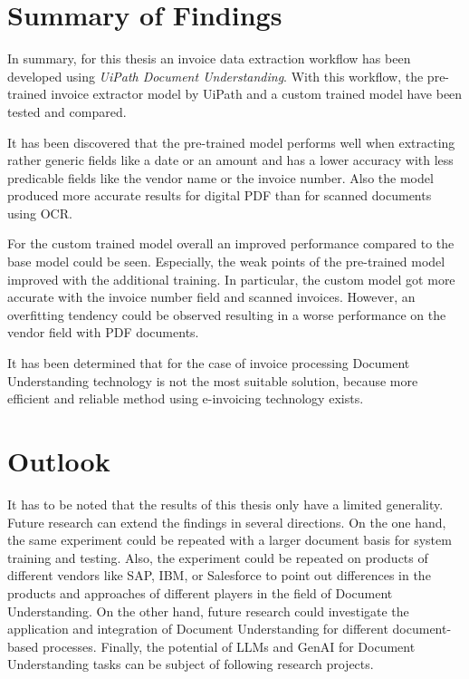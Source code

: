 \section{Summary of Findings}
In summary, for this thesis an invoice data extraction workflow has been developed using \textit{UiPath Document Understanding}. With this workflow, the pre-trained invoice extractor model by UiPath and a custom trained model have been tested and compared.

It has been discovered that the pre-trained model performs well when extracting rather generic fields like a date or an amount and has a lower accuracy with less predicable fields like the vendor name or the invoice number. Also the model produced more accurate results for digital PDF than for scanned documents using \ac{OCR}.

For the custom trained model overall an improved performance compared to the base model could be seen. Especially, the weak points of the pre-trained model improved with the additional training. In particular, the custom model got more accurate with the invoice number field and scanned invoices. However, an overfitting tendency could be observed resulting in a worse performance on the vendor field with PDF documents.

It has been determined that for the case of invoice processing Document Understanding technology is not the most suitable solution, because more efficient and reliable method using e-invoicing technology exists.
\section{Outlook}
It has to be noted that the results of this thesis only have a limited generality. Future research can extend the findings in several directions. On the one hand, the same experiment could be repeated with a larger document basis for system training and testing. Also, the experiment could be repeated on products of different vendors like SAP, IBM, or Salesforce to point out differences in the products and approaches of different players in the field of Document Understanding. On the other hand, future research could investigate the application and integration of Document Understanding for different document-based processes. Finally, the potential of \acp{LLM} and \ac{GenAI} for Document Understanding tasks can be subject of following research projects.
